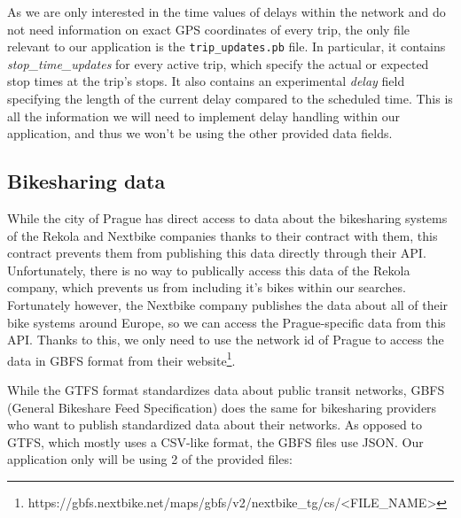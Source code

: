 As we are only interested in the time values of delays within the network and do not need information on exact GPS coordinates of every trip, the only file relevant to our application is the \texttt{trip\_updates.pb} file. In particular, it contains \textit{stop\_time\_updates} for every active trip, which specify the actual or expected stop times at the trip's stops. It also contains an experimental \textit{delay} field specifying the length of the current delay compared to the scheduled time. This is all the information we will need to implement delay handling within our application, and thus we won't be using the other provided data fields.

\subsection{Bikesharing data}

While the city of Prague has direct access to data about the bikesharing systems of the Rekola and Nextbike companies thanks to their contract with them, this contract prevents them from publishing this data directly through their API. Unfortunately, there is no way to publically access this data of the Rekola company, which prevents us from including it's bikes within our searches. Fortunately however, the Nextbike company publishes the data about all of their bike systems around Europe, so we can access the Prague-specific data from this API. Thanks to this, we only need to use the network id of Prague to access the data in GBFS format from their website\footnote{https://gbfs.nextbike.net/maps/gbfs/v2/nextbike\_tg/cs/<FILE\_NAME>}.

While the GTFS format standardizes data about public transit networks, GBFS (General Bikeshare Feed Specification) does the same for bikesharing providers who want to publish standardized data about their networks. As opposed to GTFS, which mostly uses a CSV-like format, the GBFS files use JSON\cite{gbfs2024}. Our application only will be using 2 of the provided files:

